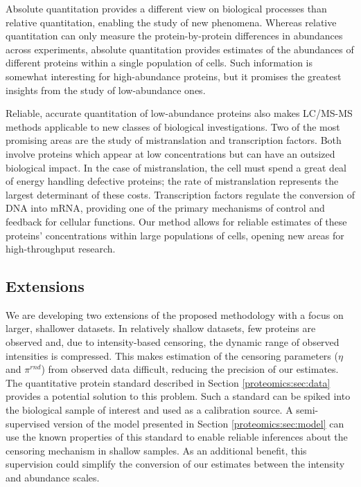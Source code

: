Absolute quantitation provides a different view on biological processes than relative quantitation, enabling the study of new phenomena.
Whereas relative quantitation can only measure the protein-by-protein differences in abundances across experiments, absolute quantitation provides estimates of the abundances of different proteins within a single population of cells.
Such information is somewhat interesting for high-abundance proteins, but it promises the greatest insights from the study of low-abundance ones.

Reliable, accurate quantitation of low-abundance proteins also makes LC/MS-MS methods applicable to new classes of biological investigations.
Two of the most promising areas are the study of mistranslation and transcription factors.
Both involve proteins which appear at low concentrations but can have an outsized biological impact.
In the case of mistranslation, the cell must spend a great deal of energy handling defective proteins; the rate of mistranslation represents the largest determinant of these costs.
Transcription factors regulate the conversion of DNA into mRNA, providing one of the primary mechanisms of control and feedback for cellular functions.
Our method allows for reliable estimates of these proteins' concentrations within large populations of cells, opening new areas for high-throughput research.

\subsection{Extensions}

We are developing two extensions of the proposed methodology with a focus on larger, shallower datasets.
In relatively shallow datasets, few proteins are observed and, due to intensity-based censoring, the dynamic range of observed intensities is compressed.
This makes estimation of the censoring parameters ($\eta$ and $\pi^{rnd}$) from observed data difficult, reducing the precision of our estimates.
The quantitative protein standard described in Section \ref{proteomics:sec:data} provides a potential solution to this problem.
Such a standard can be spiked into the biological sample of interest and used as a calibration source.
A semi-supervised version of the model presented in Section \ref{proteomics:sec:model} can use the known properties of this standard to enable reliable inferences about the censoring mechanism in shallow samples.
As an additional benefit, this supervision could simplify the conversion of our estimates between the intensity and abundance scales.

